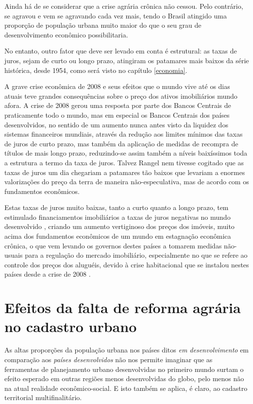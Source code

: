 \documentclass[
	12pt,				%
	oneside,			%
	a4paper,			%
	chapter=TITLE,		%
	section=TITLE,		%
	english,			%
	brazil				%
	]{abntex2}
\begin{document}
Ainda há de se considerar que a crise agrária crônica não cessou. Pelo
contrário, se agravou e vem se agravando cada vez mais, tendo o Brasil
atingido uma proporção de população urbana muito maior do que o seu grau
de desenvolvimento econômico possibilitaria.

No entanto, outro fator que deve ser levado em conta é estrutural: as
taxas de juros, sejam de curto ou longo prazo, atingiram os patamares
mais baixos da série histórica, desde 1954, como será visto no capítulo
\ref{economia}.

A grave crise econômica de 2008 e seus efeitos que o mundo vive até os
dias atuais teve grandes consequências sobre o preço dos ativos
imobiliários mundo afora. A crise de 2008 gerou uma resposta por parte
dos Bancos Centrais de praticamente todo o mundo, mas em especial os
Bancos Centrais dos países desenvolvidos, no sentido de um aumento nunca
antes visto da liquidez dos sistemas financeiros mundiais, através da
redução aos limites mínimos das taxas de juros de curto prazo, mas
também da aplicação de medidas de recompra de títulos de mais longo
prazo, reduzindo-se assim também a níveis baixíssimos toda a estrutura a
termo da taxa de juros. Talvez Rangel nem tivesse cogitado que as taxas
de juros um dia chegariam a patamares tão baixos que levariam a enormes
valorizações do preço da terra de maneira não-especulativa, mas de
acordo com os fundamentos econômicos.

Estas taxas de juros muito baixas, tanto a curto quanto a longo prazo,
tem estimulado financiamentos imobiliários a taxas de juros negativas no
mundo desenvolvido \autocite{serapicos}, criando um aumento vertiginoso
dos preços dos imóveis, muito acima dos fundamentos econômicos de um
mundo em estagnação econômica crônica, o que vem levando os governos
destes países a tomarem medidas não-usuais para a regulação do mercado
imobiliário, especialmente no que se refere ao controle dos preços dos
aluguéis, devido à crise habitacional que se instalou nestes países
desde a crise de 2008
\autocites{berlim}{londres}{california}{suecia}{newzeland}.

\section{Efeitos da falta de reforma agrária no cadastro
urbano}\label{efeitos-da-falta-de-reforma-agruxe1ria-no-cadastro-urbano}

As altas proporções da população urbana nos países ditos \emph{em
desenvolvimento} em comparação aos \emph{países desenvolvidos} não nos
permite imaginar que as ferramentas de planejamento urbano desenvolvidas
no primeiro mundo surtam o efeito esperado em outras regiões menos
desenvolvidas do globo, pelo menos não na atual realidade
econômico-social. E isto também se aplica, é claro, ao cadastro
territorial multifinalitário.
\end{document}
